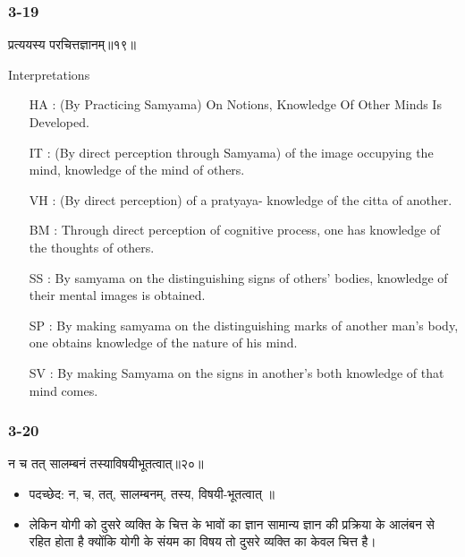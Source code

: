 \begin{frame}[fragile]\frametitle{3-19}
\begin{sanskrit}
प्रत्ययस्य परचित्तज्ञानम्॥१९॥
\end{sanskrit}

Interpretations
\begin{itemize}	
\item [HA]: (By Practicing Samyama) On Notions, Knowledge Of Other Minds Is Developed.
\item [IT]: (By direct perception through Samyama) of the image occupying the mind, knowledge of the mind of others.
\item [VH]: (By direct perception) of a pratyaya- knowledge of the citta of another.
\item [BM]: Through direct perception of cognitive process, one has knowledge of the thoughts of others.
\item [SS]: By samyama on the distinguishing signs of others’ bodies, knowledge of their mental images is obtained.
\item [SP]: By making samyama on the distinguishing marks of another man’s body, one obtains knowledge of the nature of his mind.
\item [SV]: By making Samyama on the signs in another’s both knowledge of that mind comes. 
\end{itemize}
\end{frame}

\begin{frame}[fragile]\frametitle{3-20}
\begin{sanskrit}
न च तत् सालम्बनं तस्याविषयीभूतत्वात्॥२०॥
\end{sanskrit}

\begin{itemize}
\item पदच्छेद:  न, च, तत्, सालम्बनम्, तस्य, विषयी-भूतत्वात् ॥
\item लेकिन योगी को दुसरे व्यक्ति के चित्त के भावों का ज्ञान सामान्य ज्ञान की प्रक्रिया के आलंबन से रहित होता है क्योंकि योगी के संयम का विषय तो दुसरे व्यक्ति का केवल चित्त है।
\end{itemize}
\end{frame}

